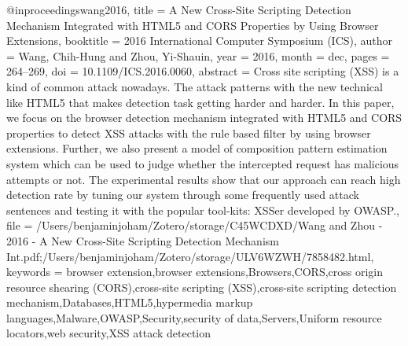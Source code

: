 @inproceedings{wang2016,
  title = {A {{New Cross}}-{{Site Scripting Detection Mechanism Integrated}} with {{HTML5}} and {{CORS Properties}} by {{Using Browser Extensions}}},
  booktitle = {2016 {{International Computer Symposium}} ({{ICS}})},
  author = {Wang, Chih-Hung and Zhou, Yi-Shauin},
  year = {2016},
  month = dec,
  pages = {264--269},
  doi = {10.1109/ICS.2016.0060},
  abstract = {Cross site scripting (XSS) is a kind of common attack nowadays. The attack patterns with the new technical like HTML5 that makes detection task getting harder and harder. In this paper, we focus on the browser detection mechanism integrated with HTML5 and CORS properties to detect XSS attacks with the rule based filter by using browser extensions. Further, we also present a model of composition pattern estimation system which can be used to judge whether the intercepted request has malicious attempts or not. The experimental results show that our approach can reach high detection rate by tuning our system through some frequently used attack sentences and testing it with the popular tool-kits: XSSer developed by OWASP.},
  file = {/Users/benjaminjoham/Zotero/storage/C45WCDXD/Wang and Zhou - 2016 - A New Cross-Site Scripting Detection Mechanism Int.pdf;/Users/benjaminjoham/Zotero/storage/ULV6WZWH/7858482.html},
  keywords = {browser extension,browser extensions,Browsers,CORS,cross origin resource shearing (CORS),cross-site scripting (XSS),cross-site scripting detection mechanism,Databases,HTML5,hypermedia markup languages,Malware,OWASP,Security,security of data,Servers,Uniform resource locators,web security,XSS attack detection}
}

